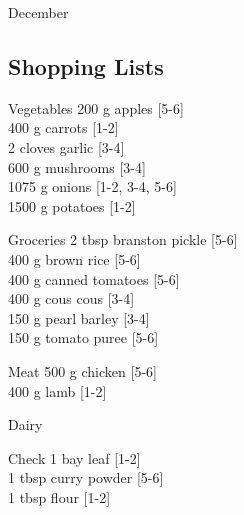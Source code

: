 \begin{menu}{December}
    \subsection*{Shopping Lists}
      \begin{shoppinglist}{Vegetables}
      200 g apples 
        {\scriptsize[5-6]}\\
      400 g carrots 
        {\scriptsize[1-2]}\\
      2 cloves garlic 
        {\scriptsize[3-4]}\\
      600 g mushrooms 
        {\scriptsize[3-4]}\\
      1075 g onions 
        {\scriptsize[1-2, 3-4, 5-6]}\\
      1500 g potatoes 
        {\scriptsize[1-2]}\\
      \end{shoppinglist}%
      \begin{shoppinglist}{Groceries}
      2 tbsp branston pickle 
        {\scriptsize[5-6]}\\
      400 g brown rice 
        {\scriptsize[5-6]}\\
      400 g canned tomatoes 
        {\scriptsize[5-6]}\\
      400 g cous cous 
        {\scriptsize[3-4]}\\
      150 g pearl barley 
        {\scriptsize[3-4]}\\
      150 g tomato puree 
        {\scriptsize[5-6]}\\
      \end{shoppinglist}%
      \par\vfil %
      \begin{shoppinglist}{Meat}
      500 g chicken 
        {\scriptsize[5-6]}\\
      400 g lamb 
        {\scriptsize[1-2]}\\
      \end{shoppinglist}%
      \begin{shoppinglist}{Dairy}
      \end{shoppinglist}%
      \par\vfil %
      \vfil\clearpage %
      \begin{shoppinglist}{Check}
      1  bay leaf 
        {\scriptsize[1-2]}\\
      1 tbsp curry powder 
        {\scriptsize[5-6]}\\
      1 tbsp flour 
        {\scriptsize[1-2]}\\

\end{shoppinglist}
\end{menu}
